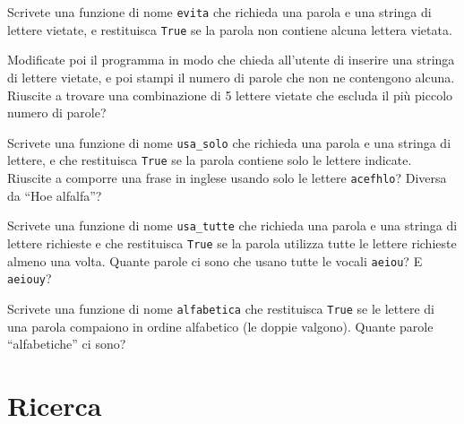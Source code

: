\documentclass[10pt]{book}
\begin{document}
\vspace{0.2in}
\begin{exercise} 

Scrivete una funzione di nome {\tt evita} che richieda una parola e una stringa di lettere vietate, e restituisca {\tt True} se la parola non contiene alcuna lettera vietata.

Modificate poi il programma in modo che chieda all'utente di inserire una stringa di lettere vietate, e poi stampi il numero di parole che non ne contengono alcuna. Riuscite a trovare una combinazione di 5 lettere vietate che escluda il più piccolo numero di parole?

\end{exercise}


\vspace{0.2in}
\begin{exercise}

Scrivete una funzione di nome \verb"usa_solo" che richieda una parola e una stringa di lettere, e che restituisca {\tt True} se la parola contiene solo le lettere indicate. Riuscite a comporre una frase in inglese usando solo le lettere
{\tt acefhlo}?  Diversa da ``Hoe alfalfa''?

\end{exercise}

\vspace{0.2in}
\begin{exercise} 

Scrivete una funzione di nome \verb"usa_tutte" che richieda una parola e una stringa di lettere richieste e che restituisca {\tt True} se la parola utilizza tutte le lettere richieste almeno una volta. Quante parole ci sono che usano tutte le vocali {\tt aeiou}?  E {\tt aeiouy}?

\end{exercise}

\vspace{0.2in}
\begin{exercise}

Scrivete una funzione di nome \verb"alfabetica" che restituisca 
{\tt True} se le lettere di una parola compaiono in ordine alfabetico (le doppie valgono). Quante parole ``alfabetiche'' ci sono?

\end{exercise}


\section{Ricerca}
\label{search}
\end{document}
